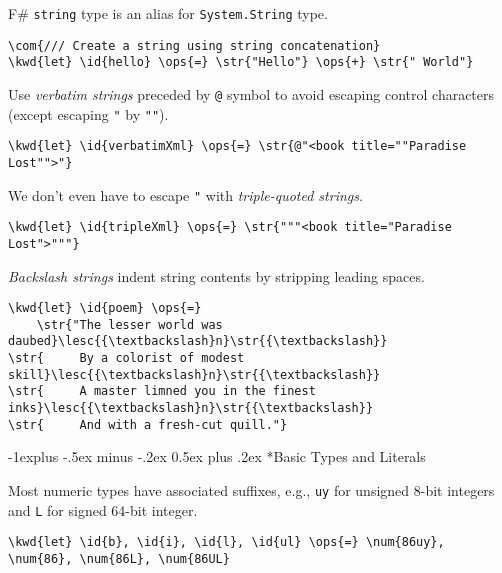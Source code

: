 \documentclass[10pt,landscape]{article}
\makeatletter
\renewcommand{\subsection}{\@startsection{subsection}{2}{0mm}%
                                {-1explus -.5ex minus -.2ex}%
                                {0.5ex plus .2ex}%
                                {\normalfont\normalsize\bfseries}}
\newcommand{\id}[1]{\textcolor[HTML]{000000}{#1}}
\newcommand{\str}[1]{\textcolor[HTML]{A31515}{#1}}
\newcommand{\kwd}[1]{\textcolor[HTML]{0000FF}{#1}}
\newcommand{\com}[1]{\textcolor[HTML]{008000}{#1}}
\newcommand{\ops}[1]{\textcolor[HTML]{000000}{#1}}
\newcommand{\num}[1]{\textcolor[HTML]{000000}{#1}}
\newcommand{\lesc}[1]{\textcolor[HTML]{FF0080}{#1}}
\makeatother
\begin{document}
\begin{multicols}{3}
F\# \texttt{string} type is an alias for \texttt{System.String} type.
\begin{Verbatim}[commandchars=\\\{\}]
\com{/// Create a string using string concatenation}
\kwd{let} \id{hello} \ops{=} \str{"Hello"} \ops{+} \str{" World"}

\end{Verbatim}



Use \emph{verbatim strings} preceded by \texttt{@} symbol to avoid escaping control characters (except escaping \texttt{"} by \texttt{""}).
\begin{Verbatim}[commandchars=\\\{\}]
\kwd{let} \id{verbatimXml} \ops{=} \str{@"<book title=""Paradise Lost"">"}

\end{Verbatim}



We don't even have to escape \texttt{"} with \emph{triple-quoted strings}.
\begin{Verbatim}[commandchars=\\\{\}]
\kwd{let} \id{tripleXml} \ops{=} \str{"""<book title="Paradise Lost">"""}

\end{Verbatim}



\emph{Backslash strings} indent string contents by stripping leading spaces.
\begin{Verbatim}[commandchars=\\\{\}]
\kwd{let} \id{poem} \ops{=} 
    \str{"The lesser world was daubed}\lesc{{\textbackslash}n}\str{{\textbackslash}}
\str{     By a colorist of modest skill}\lesc{{\textbackslash}n}\str{{\textbackslash}}
\str{     A master limned you in the finest inks}\lesc{{\textbackslash}n}\str{{\textbackslash}}
\str{     And with a fresh-cut quill."}

\end{Verbatim}

\subsection*{Basic Types and Literals}



Most numeric types have associated suffixes, e.g., \texttt{uy} for unsigned 8-bit integers and \texttt{L} for signed 64-bit integer.
\begin{Verbatim}[commandchars=\\\{\}]
\kwd{let} \id{b}, \id{i}, \id{l}, \id{ul} \ops{=} \num{86uy}, \num{86}, \num{86L}, \num{86UL}


\end{Verbatim}
\end{multicols}
\end{document}
